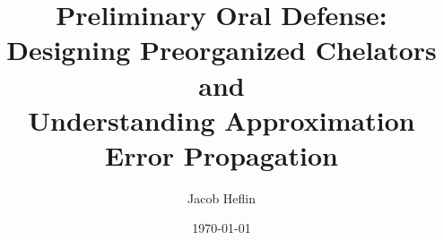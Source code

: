 \documentclass{beamer}
\title{Preliminary Oral Defense:\\Designing Preorganized Chelators and\\Understanding Approximation
Error Propagation}
\author{Jacob Heflin}
\date{\today}
\begin{document}
\frame{\titlepage}




\end{document}
